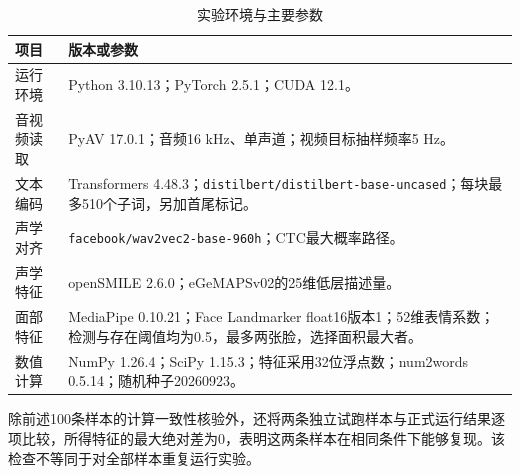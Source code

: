 \begin{table}[H]
    \centering\small
    \caption{实验环境与主要参数}
    \label{tab:p1_repro_settings}
    \setlength{\tabcolsep}{6pt}
    \renewcommand{\arraystretch}{1.12}
    \ifdefined\pOneCompactTableBox\else\newsavebox{\pOneCompactTableBox}\fi
    \begin{lrbox}{\pOneCompactTableBox}
    \begin{tabular}{l>{\raggedright\arraybackslash}p{27em}}
        \toprule
        项目 & 版本或参数\\
        \midrule
        运行环境 & Python 3.10.13；PyTorch 2.5.1；CUDA 12.1。\\
        音视频读取 & PyAV 17.0.1；音频16 kHz、单声道；视频目标抽样频率5 Hz。\\
        文本编码 & Transformers 4.48.3；\nolinkurl{distilbert/distilbert-base-uncased}；每块最多510个子词，另加首尾标记。\\
        声学对齐 & \nolinkurl{facebook/wav2vec2-base-960h}；CTC最大概率路径。\\
        声学特征 & openSMILE 2.6.0；eGeMAPSv02的25维低层描述量。\\
        面部特征 & MediaPipe 0.10.21；Face Landmarker float16版本1；52维表情系数；检测与存在阈值均为0.5，最多两张脸，选择面积最大者。\\
        数值计算 & NumPy 1.26.4；SciPy 1.15.3；特征采用32位浮点数；num2words 0.5.14；随机种子20260923。\\
        \bottomrule
    \end{tabular}
    \end{lrbox}
    \usebox{\pOneCompactTableBox}
\end{table}

除前述100条样本的计算一致性核验外，还将两条独立试跑样本与正式运行结果逐项比较，所得特征的最大绝对差为0，表明这两条样本在相同条件下能够复现。该检查不等同于对全部样本重复运行实验。
